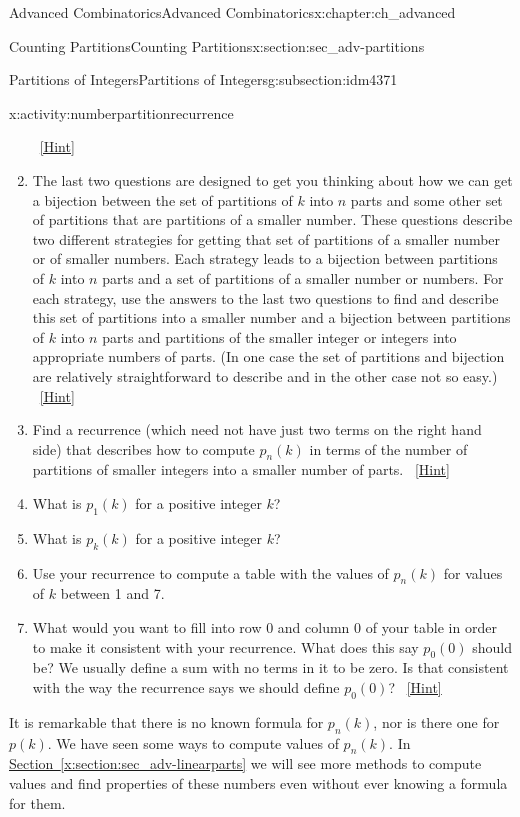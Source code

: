 \documentclass[oneside,10pt,]{book}
\numberwithin{equation}{chapter}
\begin{document}
\begin{chapterptx}{Advanced Combinatorics}{}{Advanced Combinatorics}{}{}{x:chapter:ch_advanced}
\begin{sectionptx}{Counting Partitions}{}{Counting Partitions}{}{}{x:section:sec_adv-partitions}
\begin{subsectionptx}{Partitions of Integers}{}{Partitions of Integers}{}{}{g:subsection:idm4371}
\begin{activity}{}{x:activity:numberpartitionrecurrence}
\begin{enumerate}[font=\bfseries,label=(\alph*),ref=\alph*]
\qquad~\hfill{\tiny\hyperlink{g:hint:idm4600-back}{[Hint]}}\item{}The last two questions are designed to get you thinking about how we can get a bijection between the set of partitions of \(k\) into \(n\) parts and some other set of partitions that are partitions of a smaller number.  These questions describe two different strategies for getting that set of partitions of a smaller number or of smaller numbers.  Each strategy leads to a bijection between partitions of \(k\) into \(n\) parts and a set of partitions of a smaller number or numbers.  For each strategy, use the answers to the last two questions to find and describe this set of partitions into a smaller number and a bijection between partitions of \(k\) into \(n\) parts and partitions of the smaller integer or integers into appropriate numbers of parts. (In one case the set of partitions and bijection are relatively straightforward to describe and in the other case not so easy.)%
\qquad~\hfill{\tiny\hyperlink{g:hint:idm4617-back}{[Hint]}}\item{}Find a recurrence (which need not have just two terms on the right hand side) that describes how to compute \(p_n(k)\) in terms of the number of partitions of smaller integers into a smaller number of parts.%
\qquad~\hfill{\tiny\hyperlink{g:hint:idm4649-back}{[Hint]}}\item{}What is \(p_1(k)\) for a positive integer \(k\)?%
\item{}What is \(p_k(k)\) for a positive integer \(k\)?%
\item{}Use your recurrence to compute a table with the values of \(p_n(k)\) for values of \(k\) between 1 and 7.%
\item{}What would you want to fill into row 0 and column 0 of your table in order to make it consistent with your recurrence.  What does this say \(p_0(0)\) should be?  We usually define a sum with no terms in it to be zero. Is that consistent with the way the recurrence says we should define \(p_0(0)\)?%
\qquad~\hfill{\tiny\hyperlink{g:hint:idm4763-back}{[Hint]}}\end{enumerate}
\end{activity}
It is remarkable that there is no known formula for \(p_n(k)\), nor is there one for \(p(k)\). We have seen some ways to compute values of \(p_n(k)\).  In \hyperref[x:section:sec_adv-linearparts]{Section~\ref{x:section:sec_adv-linearparts}} we will see more methods to compute values and find properties of these numbers even without ever knowing a formula for them.%

\end{subsectionptx}
\end{sectionptx}
\end{chapterptx}
\end{document}
